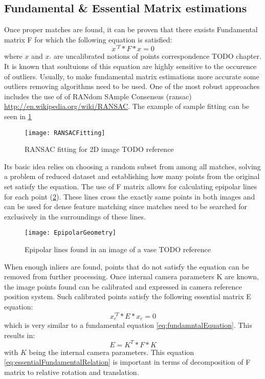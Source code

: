 \subsection{Fundamental \& Essential Matrix estimations}
Once proper matches are found, it can be proven that there exsists Fundamental matrix F for which the following equation is satisfied:
\begin{equation} \label{eq:fundamntalEquation}
{x}^{'T} * F * x = 0
\end{equation} 
where $x$ and ${x}_{'}$ are uncalibrated notions of points correspondence \cite{HartletMultipleView}TODO chapter. It is known that soultuions of this equation are highly sensitive to the occurence of outliers. Usually, to make fundamental matrix estimations more accurate some outliers removing algorithms need to be used. One of the most robust approaches includes the use of of RANdom SAmple Consensus (\gls{ransac}) \url{http://en.wikipedia.org/wiki/RANSAC}. The example of sample fitting can be seen in \ref{fig:RANSACFitting}
\begin{figure}[p]
    \centering
    \texttt{[image: RANSACFitting]}
    \caption{RANSAC fitting for 2D image TODO reference}
    \label{fig:RANSACFitting}
\end{figure}
Its basic idea relies on choosing a random subset from among all matches, solving a problem of reduced dataset and establishing how many points from the original set satisfy the equation.
The use of F matrix allows for calculating epipolar lines for each point (\ref{fig:EpipolarGeometry}). These lines cross the exactly same points in both images and can be used for dense feature matching since matches need to be searched for exclusively in the surroundings of these lines.
\begin{figure}[p]
    \centering
    \texttt{[image: EpipolarGeometry]}
    \caption{Epipolar lines found in an image of a vase TODO reference}
    \label{fig:EpipolarGeometry}
\end{figure}
When enough inliers are found, points that do not satisfy the equation can be removed from further processing.
Once internal camera parameters K are known, the image points found can be calibrated and expressed in camera reference position system. Such calibrated points satisfy the following essential matrix E equation:
\begin{equation} \label{eq:essentialEquation}
{x}_{c}^{'T} * E * x_{c} = 0
\end{equation} 
which is very similar to a fundamental equation \ref{eq:fundamntalEquation}. This results in:
\begin{equation} \label{eq:essentialFundamentalRelation}
E = K^{T} * F * K
\end{equation} 
with $K$ being the internal camera parameters. This equation \ref{eq:essentialFundamentalRelation} is important in terms of decomposition of F matrix to relative rotation and translation.
